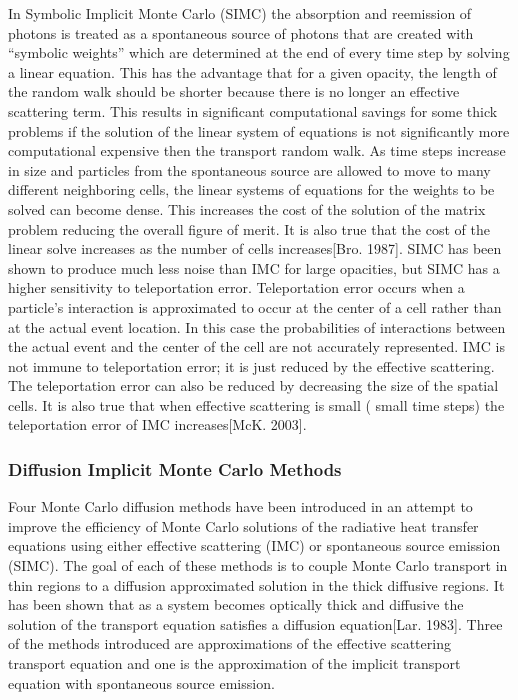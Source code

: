 	In Symbolic Implicit Monte Carlo (SIMC) the absorption and reemission of photons is treated as a spontaneous source of photons that are created with ``symbolic weights'' which are determined at the end of every time step by solving a linear equation. This has the advantage that for a given opacity, the length of the random walk should be shorter because there is no longer an effective scattering term. This results in significant computational savings for some thick problems if the solution of the linear system of equations is not significantly more computational expensive then the transport random walk. As time steps increase in size and particles from the spontaneous source are allowed to move to many different neighboring cells, the linear systems of equations for the weights to be solved can become dense. This increases the cost of the solution of the matrix problem reducing the overall figure of merit. It is also true that the cost of the linear solve increases as the number of cells increases[Bro. 1987]. SIMC has been shown to produce much less noise than IMC for large opacities, but SIMC has a higher sensitivity to teleportation error. Teleportation error occurs when a particle's interaction is approximated to occur at the center of a cell rather than at the actual event location. In this case the probabilities of interactions between the actual event and the center of the cell are not accurately represented. IMC is not immune to teleportation error; it is just reduced by the effective scattering. The teleportation error can also be reduced by decreasing the size of the spatial cells. It is also true that when effective scattering is small ( small time steps) the teleportation error of IMC increases[McK. 2003].
   
\belowSubSecSkip

\subsubsection{Diffusion Implicit Monte Carlo Methods}
\label{sec:Intro-DIMC}
	
\noindent
	\indent Four Monte Carlo diffusion methods have been introduced in an attempt to improve the efficiency of Monte Carlo solutions of the radiative heat transfer equations using either effective scattering (IMC) or spontaneous source emission (SIMC). The goal of each of these methods is to couple Monte Carlo transport in thin regions to a diffusion approximated solution in the thick diffusive regions. It has been shown that as a system becomes optically thick and diffusive the solution of the transport equation satisfies a diffusion equation[Lar. 1983]. Three of the methods introduced are approximations of the effective scattering transport equation and one is the approximation of the implicit transport equation with spontaneous source emission.

